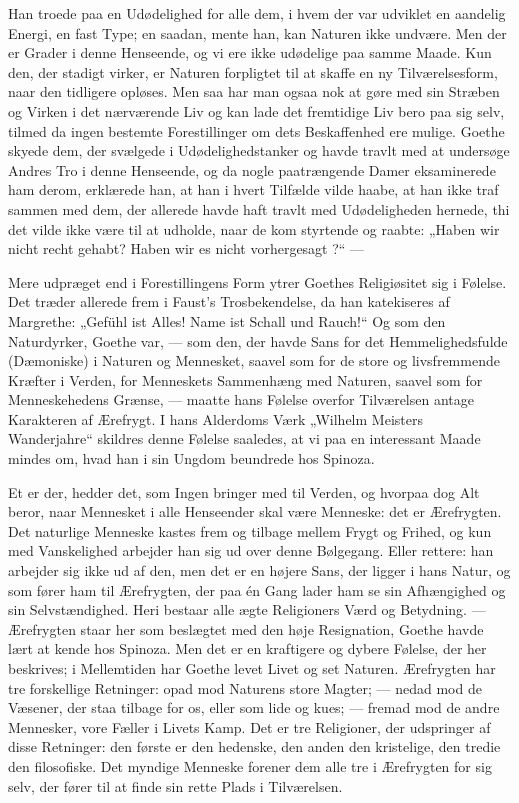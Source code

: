 \documentclass[12pt,a4paper,openany]{book}
\newcommand{\opage}[1]{\marginnote{\footnotesize\textit{[#1]}}}
\begin{document}
Han troede paa en Udødelighed for alle dem, i hvem der
var udviklet en aandelig Energi, en fast Type; en saadan,
mente han, kan Naturen ikke undvære. Men der er Grader i
denne Henseende, og vi ere ikke udødelige paa samme Maade.
Kun den, der stadigt virker, er Naturen forpligtet til at skaffe
en ny Tilværelsesform, naar den tidligere opløses. Men saa
har man ogsaa nok at gøre med sin Stræben og Virken i det
nærværende Liv og kan lade det fremtidige Liv bero paa sig
selv, tilmed da ingen bestemte Forestillinger om dets Beskaffenhed
ere mulige. Goethe skyede dem, der svælgede i Udødelighedstanker
og havde travlt med at undersøge Andres Tro i
denne Henseende, og da nogle paatrængende Damer eksaminerede
ham derom, erklærede han, at han i hvert Tilfælde
vilde haabe, at han ikke traf sammen med dem, der allerede
\setcounter{footnote}{0}%
\opage{174}havde haft travlt med Udødeligheden hernede, thi det vilde
ikke være til at udholde, naar de kom styrtende og raabte:
„Haben wir nicht recht gehabt? Haben wir es nicht vorhergesagt
?“ ---

Mere udpræget end i Forestillingens Form ytrer Goethes
Religiøsitet sig i Følelse. Det træder allerede frem i Faust’s
Trosbekendelse, da han katekiseres af Margrethe: „Gefühl ist
Alles! Name ist Schall und Rauch!“ Og som den Naturdyrker,
Goethe var, --- som den, der havde Sans for det Hemmelighedsfulde
(Dæmoniske) i Naturen og Mennesket, saavel som for
de store og livsfremmende Kræfter i Verden, for Menneskets
Sammenhæng med Naturen, saavel som for Menneskehedens
Grænse, --- maatte hans Følelse overfor Tilværelsen antage Karakteren
af Ærefrygt. I hans Alderdoms Værk „Wilhelm Meisters
Wanderjahre“ skildres denne Følelse saaledes, at vi paa
en interessant Maade mindes om, hvad han i sin Ungdom beundrede
hos Spinoza.

Et er der, hedder det, som Ingen bringer med til Verden,
og hvorpaa dog Alt beror, naar Mennesket i alle Henseender
skal være Menneske: det er Ærefrygten. Det naturlige Menneske
kastes frem og tilbage mellem Frygt og Frihed, og kun
med Vanskelighed arbejder han sig ud over denne Bølgegang.
Eller rettere: han arbejder sig ikke ud af den, men det er en
højere Sans, der ligger i hans Natur, og som fører ham til
Ærefrygten, der paa én Gang lader ham se sin Afhængighed
og sin Selvstændighed. Heri bestaar alle ægte Religioners Værd
og Betydning. --- Ærefrygten staar her som beslægtet med den
høje Resignation, Goethe havde lært at kende hos Spinoza.
Men det er en kraftigere og dybere Følelse, der her beskrives;
i Mellemtiden har Goethe levet Livet og set Naturen. Ærefrygten
har tre forskellige Retninger: opad mod Naturens store
Magter; --- nedad mod de Væsener, der staa tilbage for os,
eller som lide og kues; --- fremad mod de andre Mennesker,
vore Fæller i Livets Kamp. Det er tre Religioner, der udspringer
af disse Retninger: den første er den hedenske, den
anden den kristelige, den tredie den filosofiske. Det myndige
\setcounter{footnote}{0}%
\opage{175}Menneske forener dem alle tre i Ærefrygten for sig selv, der
fører til at finde sin rette Plads i Tilværelsen.
\end{document}
